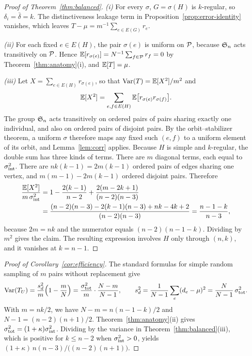 \begin{proof}[Proof of Theorem~\ref{thm:balanced}]
\emph{(i)} For every $\sigma$, $G=\sigma(H)$ is $k$-regular, so
$\delta_i=\bar\delta=k$. The distinctiveness leakage term in
Proposition~\ref{prop:error-identity} vanishes, which leaves
$T-\mu=m^{-1}\sum_{e\in E(G)}r_e$.

\emph{(ii)} For each fixed $e\in E(H)$, the pair $\sigma(e)$ is uniform on $\mathcal{P}$,
because $\mathfrak{S}_n$ acts transitively on $\mathcal{P}$. Hence
$\mathbb{E}[r_{\sigma(e)}]=N^{-1}\sum_{f\in\mathcal{P}}r_f=0$ by Theorem~\ref{thm:anatomy}(i), and
$\mathbb{E}[T]=\mu$.

\emph{(iii)} Let $X=\sum_{e\in E(H)}r_{\sigma(e)}$, so that $\operatorname{Var}(T)=\mathbb{E}[X^2]/m^2$ and
\[
\mathbb{E}[X^2]=\sum_{e,f\in E(H)}\mathbb{E}\big[r_{\sigma(e)}r_{\sigma(f)}\big].
\]
The group $\mathfrak{S}_n$ acts transitively on ordered pairs of pairs sharing exactly one
individual, and also on ordered pairs of disjoint pairs. By the orbit--stabilizer
theorem, a uniform $\sigma$ therefore maps any fixed such $(e,f)$ to a uniform
element of its orbit, and Lemma~\ref{lem:corr} applies. Because $H$ is simple and
$k$-regular, the double sum has three kinds of terms. There are $m$ diagonal
terms, each equal to $\sigma^2_{\mathrm{int}}$. There are $nk(k-1)=2m(k-1)$ ordered pairs
of edges sharing one vertex, and $m(m-1)-2m(k-1)$ ordered disjoint pairs. Therefore
\begin{align*}
\frac{\mathbb{E}[X^2]}{m\,\sigma^2_{\mathrm{int}}}
&=1-\frac{2(k-1)}{n-2}+\frac{2(m-2k+1)}{(n-2)(n-3)}\\
&=\frac{(n-2)(n-3)-2(k-1)(n-3)+nk-4k+2}{(n-2)(n-3)}
=\frac{n-1-k}{n-3},
\end{align*}
because $2m=nk$ and the numerator equals $(n-2)(n-1-k)$. Dividing by
$m^2$ gives the claim. The resulting expression involves $H$ only through
$(n,k)$, and it vanishes at $k=n-1$.
\end{proof}



\begin{proof}[Proof of Corollary~\ref{cor:efficiency}]
The standard formulas for simple random sampling of $m$ pairs without replacement \citep[Ch.~2]{cochran1977sampling} give
\[
\operatorname{Var}(T_U)=\frac{s_d^2}{m}\Big(1-\frac mN\Big)=\frac{\sigma^2_{\mathrm{tot}}}{m}\cdot\frac{N-m}{N-1},
\qquad s_d^2=\frac{1}{N-1}\sum_{e}(d_e-\mu)^2=\frac{N}{N-1}\,\sigma^2_{\mathrm{tot}} .
\]
With $m=nk/2$, we have
$N-m=n(n-1-k)/2$ and $N-1=(n-2)(n+1)/2$. Theorem~\ref{thm:anatomy}(ii) gives
$\sigma^2_{\mathrm{tot}}=(1+\kappa)\sigma^2_{\mathrm{int}}$. Dividing by the variance in Theorem~\ref{thm:balanced}(iii), which is positive for
$k\le n-2$ when $\sigma^2_{\mathrm{int}}>0$, yields $(1+\kappa)\,n(n-3)/\bigl((n-2)(n+1)\bigr)$.
\end{proof}

